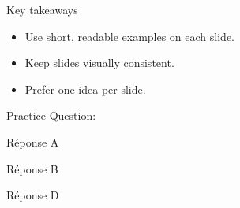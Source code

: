 \documentclass[aspectratio=32,11pt]{beamer}
\begin{document}
\begin{frame}{Key takeaways}
  \begin{itemize}
    \item Use short, readable examples on each slide.
    \item Keep slides visually consistent.
    \item Prefer one idea per slide.
  \end{itemize}
\end{frame}

\begin{frame}{Practice}
Question: 
  \begin{quiz}
    \item Réponse A
    \item Réponse B
    \item Réponse D
  \end{quiz}
\end{frame}
\end{document}

